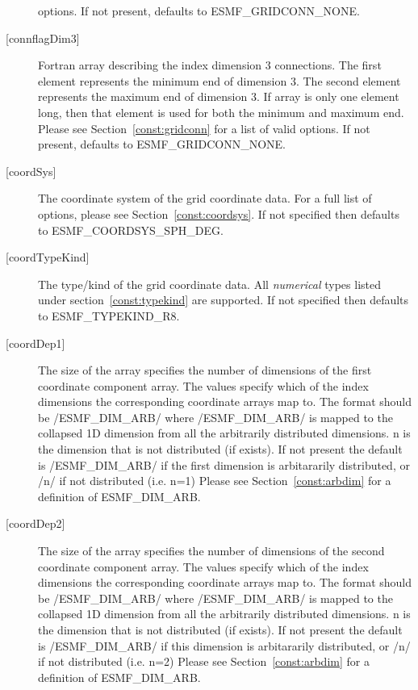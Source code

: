 \begin{description}
        options. If not present, defaults to ESMF\_GRIDCONN\_NONE.
   \item[{[connflagDim3]}]
        Fortran array describing the index dimension 3 connections.
        The first element represents the minimum end of dimension 3.
        The second element represents the maximum end of dimension 3.
        If array is only one element long, then that element is used
        for both the minimum and maximum end.
        Please see Section~\ref{const:gridconn} for a list of valid
        options. If not present, defaults to ESMF\_GRIDCONN\_NONE.
   \item[{[coordSys]}]
       The coordinate system of the grid coordinate data.
       For a full list of options, please see Section~\ref{const:coordsys}.
       If not specified then defaults to ESMF\_COORDSYS\_SPH\_DEG.
   \item[{[coordTypeKind]}]
       The type/kind of the grid coordinate data. All {\em numerical} types
       listed under section~\ref{const:typekind} are supported.
       If not specified then defaults to ESMF\_TYPEKIND\_R8.
   \item[{[coordDep1]}]
       The size of the array specifies the number of dimensions of the
       first coordinate component array. The values specify which
       of the index dimensions the corresponding coordinate
       arrays map to. The format should be /ESMF\_DIM\_ARB/ where
       /ESMF\_DIM\_ARB/ is mapped to the collapsed 1D dimension from all
       the arbitrarily distributed dimensions.  n is the dimension that
       is not distributed (if exists).
       If not present the default is /ESMF\_DIM\_ARB/ if the first dimension
       is arbitararily distributed, or /n/ if not distributed (i.e. n=1)
        Please see Section~\ref{const:arbdim} for a definition of ESMF\_DIM\_ARB.
   \item[{[coordDep2]}]
       The size of the array specifies the number of dimensions of the
       second coordinate component array. The values specify which
       of the index dimensions the corresponding coordinate
       arrays map to. The format should be /ESMF\_DIM\_ARB/ where
       /ESMF\_DIM\_ARB/ is mapped to the collapsed 1D dimension from all
       the arbitrarily distributed dimensions.  n is the dimension that
       is not distributed (if exists).
       If not present the default is /ESMF\_DIM\_ARB/ if this dimension
       is arbitararily distributed, or /n/ if not distributed (i.e. n=2)
       Please see Section~\ref{const:arbdim} for a definition of ESMF\_DIM\_ARB.

\end{description}
